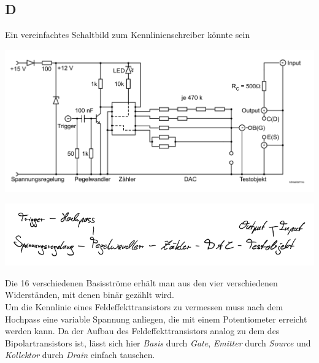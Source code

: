 \documentclass[10pt]{article}
\newenvironment{Figure}
  {\par\medskip\noindent\minipage{\linewidth}}
  {\endminipage\par\medskip}
\begin{document}
\begin{multicols}{2}
	\subsection{D}
	Ein vereinfachtes Schaltbild zum Kennlinienschreiber könnte sein
	\begin{Figure}
		\begin{minipage}{0.5\textwidth}
			\centering
			\includegraphics[width=\textwidth]{kennlinienschreiber.png}
		\end{minipage}
		\begin{minipage}{0.5\textwidth}
			\centering
			\includegraphics[width=\textwidth]{D_crop.pdf}
		\end{minipage}
	\end{Figure}
	Die 16 verschiedenen Basisströme erhält man aus den vier verschiedenen Widerständen, mit denen binär gezählt wird.
	\\\indent Um die Kennlinie eines Feldeffekttransistors zu vermessen muss nach dem Hochpass eine variable Spannung anliegen, die mit einem Potentiometer erreicht werden kann.
	Da der Aufbau des Feldeffekttransistors analog zu dem des Bipolartransistors ist, lässt sich hier \textit{Basis} durch \textit{Gate}, \textit{Emitter} durch \textit{Source} und \textit{Kollektor} durch \textit{Drain} einfach tauschen.


\end{multicols}
\end{document}

